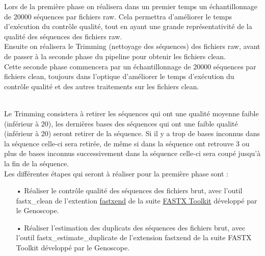 \begin{minipage}{0.45\textwidth}

    Lors de la première phase on réalisera dans un premier temps un échantillonnage de 20000 séquences par fichiers \og raw\fg{}. Cela permettra d'améliorer le temps d'exécution du contrôle qualité, tout en ayant une grande représentativité de la qualité des séquences des fichiers \og raw\fg{}.\\

    Ensuite on réalisera le \og Trimming\fg{} (nettoyage des séquences) des fichiers \og raw\fg{}, avant de passer à la seconde phase du pipeline pour obtenir les fichiers \og clean\fg{}.\\

    Cette seconde phase commencera par un échantillonnage de 20000 séquences par fichiers \og clean\fg{}, toujours dans l'optique d'améliorer le temps d'exécution du contrôle qualité et des autres traitements sur les fichiers \og clean\fg{}.


\end{minipage}\\[0.5cm]

Le Trimming consistera à retirer les séquences qui ont une qualité moyenne faible (inférieur à 20), les dernières bases des séquences qui ont une faible qualité (inférieur à 20) seront retirer de la séquence. Si il y a trop de bases inconnus dans la séquence celle-ci sera retirée, de même si dans la séquence ont retrouve 3 ou plus de bases inconnus successivement dans la séquence celle-ci sera coupé jusqu'à la fin de la séquence.\\


Les différentes étapes qui seront à réaliser pour la première phase sont :\\
\begin{itemize}
    \item[•] Réaliser le contrôle qualité des séquences des fichiers brut, avec l'outil fastx\_clean de l'extention \href{https://github.com/institut-de-genomique/fastxtend}{fastxend} de la suite \href{http://hannonlab.cshl.edu/fastx_toolkit/}{FASTX Toolkit} développé par le Genoscope.
    \item[•] Réaliser l'estimation des duplicats des séquences des fichiers brut, avec l'outil fastx\_estimate\_duplicate de l'extension fastxend de la suite FASTX Toolkit développé par le Genoscope.\\
\end{itemize}

